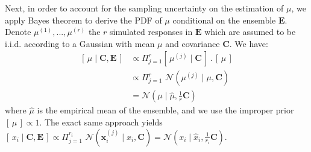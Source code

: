 \documentclass[12pt]{article}
\newcommand{\x}{\boldsymbol{x}}
\newcommand{\E}{\mathbf{E}}
\begin{document}
\begin{appendix}[A]
Next, in order to account for the sampling uncertainty on the estimation of $\mu$, we apply Bayes theorem to derive the PDF of $\mu$ conditional on the ensemble $\E$. Denote $\mu^{(1)},...,\mu^{(r)}$ the $r$  simulated responses in $\E$ which are assumed to be i.i.d. according to a Gaussian with mean $\mu$ and covariance $\mathbf C$. We have:
\begin{equation} 
\label{modelcov1}
\begin{array}{ll}
\left[\,\mu\mid \mathbf{C}, \E\,\right]&\propto \Pi_{j=1}^r \left[\,\mu^{(j)}\mid \mathbf{C}\,\right]\,.\,\left[\,\mu\,\right]\\
&\propto \Pi_{j=1}^r \,\,\mathcal{N}(\mu^{(j)}\mid \mu,\mathbf{C})\\
&=\mathcal{N}(\mu\mid \widehat{\mu},\frac{1}{r}\mathbf{C})
\end{array}
\end{equation}
where $\widehat{\mu}$ is the empirical mean of the ensemble, and we use the improper prior $\left[\,\mu\,\right]\propto 1$. The exact same approach yields $\left[\,x_i\mid \mathbf{C}, \E\,\right]\propto \Pi_{j=1}^{r_i} \,\,\mathcal{N}(\x_i^{(j)}\mid x_i,\mathbf{C})=\mathcal{N}(x_i\mid \widehat{x}_i,\frac{1}{r_i}\mathbf{C})$. 



\end{appendix}
\end{document}
